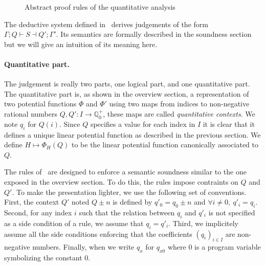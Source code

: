 \documentclass[10pt]{article}
\newcommand{\pref}[1]{\prettyref{#1}}
\begin{document}
\begin{figure}[ht!]
\caption{Abstract proof rules of the quantitative analysis}
\label{fig:proof}
\end{figure}

The deductive system defined in~\pref{fig:proof} derives
judgements of the form $\Gamma; Q \vdash S \dashv Q'; \Gamma'$.
Its semantics are formally described in the soundness section but we
will give an intuition of its meaning here.

\paragraph{Quantitative part.}
The judgement is really two parts, one logical part, and one quantitative
part.  The quantitative part is, as shown in the overview section, a
representation of two potential functions $\Phi$ and $\Phi'$ using
two maps from indices to non-negative rational numbers
$Q, Q' : I \rightarrow \mathbb Q_0^+$, these maps are called
\emph{quantitative contexts}.
We note $q_i$ for $Q(i)$.  Since $Q$ specifies a value for each
index in $I$ it is clear that it defines a unique linear potential function
as described in the previous section. We define $H \mapsto \Phi_H(Q)$
to be the linear potential function canonically associated to $Q$.

The rules of~\pref{fig:proof} are designed to enforce a semantic
soundness similar to the one exposed in the overview section.  To
do this, the rules impose contraints on $Q$ and $Q'$.  To make the
presentation lighter, we use the following  set of conventions.
First, the context $Q'$ noted $Q \pm n$ is defined by $q'_0 = q_0 \pm n$
and $\forall i \neq 0,~q'_i = q_i$.  Second, for any index $i$ such that
the relation between $q_i$ and $q'_i$ is not specified as a side condition
of a rule, we assume that $q_i = q'_i$.  Third, we implicitely assume
all the side conditions enforcing that the coefficients $(q_i)_{i \in I}$ are
non-negative numbers. Finally, when we write $q_x$ for $q_{x0}$ where
0 is a program variable symbolizing the constant 0.
\end{document}
